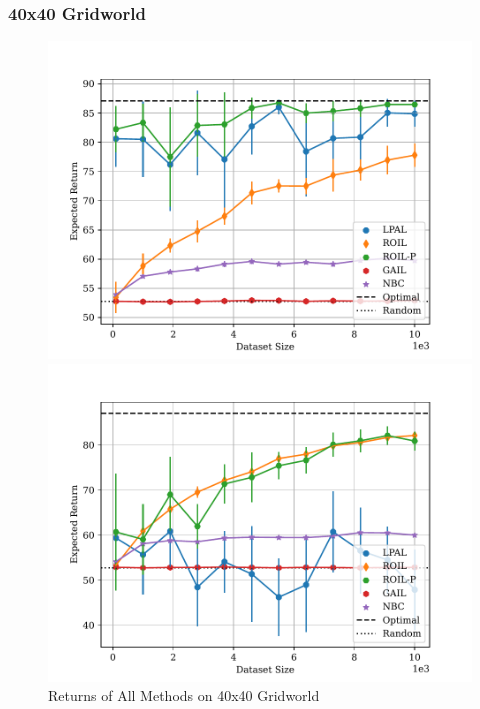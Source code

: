 \documentclass{beamer}
\begin{document}
\begin{frame}
\frametitle{40x40 Gridworld}

\begin{figure}
  \begin{center}
  \begin{minipage}{0.45\linewidth}
    \centering
    \includegraphics[width=\linewidth]{plots/returns/40x40_gridworld_on_policy_returns.pdf}
  \end{minipage}
  \hspace{0.05\linewidth}
  \begin{minipage}{0.45\linewidth}
    \centering
    \includegraphics[width=\linewidth]{plots/returns/40x40_gridworld_off_policy_returns.pdf}
  \end{minipage}
  \end{center}
\caption{Returns of All Methods on 40x40 Gridworld}
\end{figure}

\end{frame}
\end{document}
